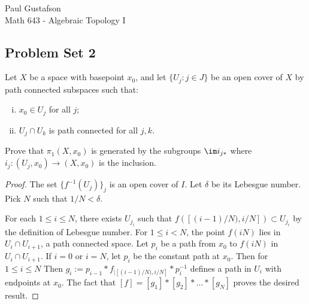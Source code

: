 \documentclass{article}
\begin{document}
\noindent Paul Gustafson\\
\noindent Math 643 - Algebraic Topology I

\subsection*{Problem Set 2} 
 Let $X$ be a space with basepoint $x_0$, and let $\{U_j : j \in J\}$ be an open cover of $X$
by path connected subspaces such that:
\begin{enumerate}[(i)]
\item $x_0 \in U_j$ for all $j$;
\item $U_j \cap U_k$ is path connected for all $j,k$.
\end{enumerate}
Prove that $\pi_1(X,x_0)$ is generated by the subgroups $\im i_{j*}$ where $i_j:(U_j, x_0) \to (X, x_0)$ is the inclusion.
\begin{proof}
The set $\{f^{-1}(U_j)\}_j$ is an open cover of $I$. Let $\delta$ be its Lebesgue number. Pick $N$ such that $1/N < \delta$.

For each $1 \le i \le N$, there exists $U_{j_i}$ such that $f([(i-1)/N), i/N]) \subset U_{j_i}$ by the definition of Lebesgue number.
For $1 \le i < N$, the point $f(iN)$ lies in $U_i \cap U_{i+1}$, a path connected space.  Let $p_i$ be a path from $x_0$ to $f(iN)$
in $U_i \cap U_{i+1}$. If $i = 0$ or $i=N$, let $p_i$ be the constant path at $x_0$.
Then for $1 \le i \le N$ Then $g_i := p_{i-1} * f_{|[(i-1)/N), i/N]} * p_{i}^{-1}$ defines a path in $U_i$ with endpoints at $x_0$.
The fact that $[f] = [g_1]*[g_2]* \ldots * [g_N]$ proves the desired result.
\end{proof}
\end{document}
